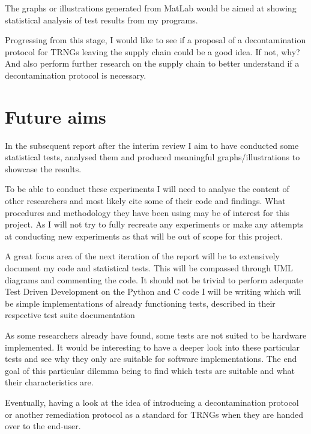 \documentclass[]{final_report}
\begin{document}
\par{The graphs or illustrations generated from MatLab would be aimed at showing statistical analysis of test results from my programs.}

\par{Progressing from this stage, I would like to see if a proposal of a decontamination protocol for TRNGs leaving the supply chain could be a good idea. If not, why? And also perform further research on the supply chain to better understand if a decontamination protocol is necessary.}

\section*{Future aims}

\par{In the subsequent report after the interim review I aim to have conducted some statistical tests, analysed them and produced meaningful graphs/illustrations to showcase the results.}

\par{To be able to conduct these experiments I will need to analyse the content of other researchers and most likely cite some of their code and findings. What procedures and methodology they have been using may be of interest for this project. As I will not try to fully recreate any experiments or make any attempts at conducting new experiments as that will be out of scope for this project.}

\par{A great focus area of the next iteration of the report will be to extensively document my code and statistical tests. This will be compassed through UML diagrams and commenting the code. It should not be trivial to perform adequate Test Driven Development on the Python and C code I will be writing which will be simple implementations of already functioning tests, described in their respective test suite documentation}

\par{As some researchers already have found, some tests are not suited to be hardware implemented. It would be interesting to have a deeper look into these particular tests and see why they only are suitable for software implementations. The end goal of this particular dilemma being to find which tests are suitable and what their characteristics are.}

\par{Eventually, having a look at the idea of introducing a decontamination protocol or another remediation protocol as a standard for TRNGs when they are handed over to the end-user.}
\end{document}
